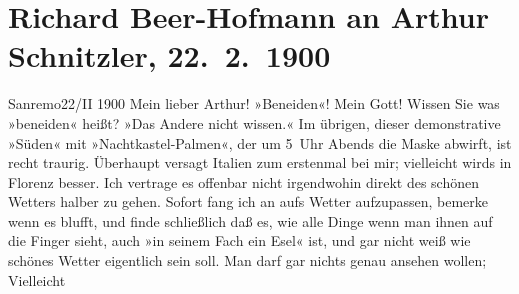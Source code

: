 

         
         \newcommand{\erwaehntePersonen}{Personen: Christian Wilhelm Allers, Paula Beer-Hofmann, Mirjam Beer-Hofmann, Georg Brandes, Berta Doepler, Georg Hirschfeld, Robert Hirschfeld, Hugo von Hofmannsthal, Oskar Mayer, Max Messer, Elly Petersen, Gustav Schwarzkopf}
         \newcommand{\erwaehnteInstitutionen}{}
         \newcommand{\erwaehnteOrte}{Orte: Bad Ischl, Florenz, Italien, Sanremo, Wien}
         \newcommand{\erwaehnteWerke}{Werke: Der Tod Georgs, Kabale und Liebe, Wiener Bummelgeschichten}
               \section[Richard Beer-Hofmann an Arthur Schnitzler, 22. 2. 1900]{ Richard Beer-Hofmann an Arthur Schnitzler, 22. 2. 1900}\nopagebreak{}\rehead{ }\begin{ledgroupsized}[t]{13cm}\normalsize\beginnumbering \toendnotes[C]{\smallbreak\pagebreak[2]} 
\toendnotes[C]{\smallbreak}\pstart
           \raggedleft{}{\pb}Sanremo22/II 1900\pend
           \pstart
           Mein lieber Arthur! »Beneiden«! Mein Gott! Wissen Sie was »beneiden«
               heißt? »Das Andere nicht wissen.« Im übrigen, dieser demonstrative »Süden« mit
               »Nachtkastel-Palmen«, der um 5 Uhr Abends die Maske abwirft, ist recht traurig.
               Überhaupt versagt Italien zum erstenmal bei mir;
               vielleicht wirds in Florenz besser. Ich vertrage es
               offenbar nicht irgendwohin direkt des schönen Wetters halber zu gehen. Sofort fang
               ich an aufs Wetter aufzupassen, bemerke wenn es blufft, und finde schließlich daß es,
               wie alle Dinge wenn man ihnen auf die Finger sieht, auch »in seinem Fach ein Esel«
               ist, und gar nicht weiß wie schönes Wetter eigentlich sein soll. Man darf gar nichts
               genau ansehen wollen; {\pb}Vielleicht

\end{ledgroupsized}
